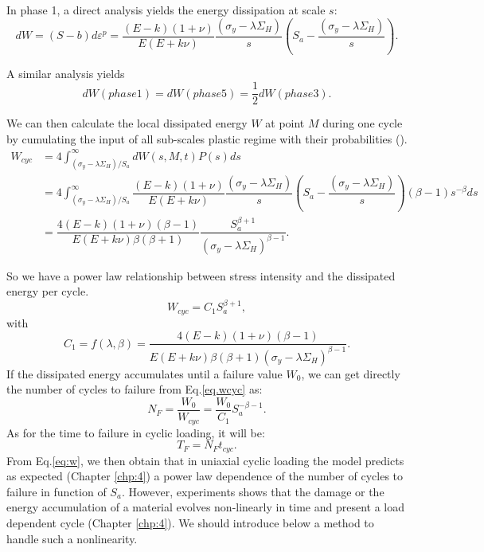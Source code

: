 \documentclass[3p,times,procedia,number]{elsarticle}
\begin{document}
In phase 1, a direct analysis yields the energy dissipation at scale $s$:
\begin{equation}dW=(S-b)d\varepsilon^p=\dfrac{(E-k)(1+\nu) }{E(E+k\nu)}\dfrac{ \left(\sigma_y-\lambda \Sigma_H\right)}{s}\left(S_{a}-\dfrac{ \left(\sigma_y-\lambda \Sigma_H\right)}{s}\right).
\label{dw}
\end{equation}

A similar analysis yields $$dW(phase 1)=dW(phase 5)=\dfrac{1}{2}dW(phase 3).$$

We can then calculate  the local dissipated energy $W$  at point $M$ during one cycle by cumulating the input of all sub-scales plastic regime with their probabilities (\cite{zepeng}).
\begin{equation}
\begin{split}
W_{cyc}&=4\int_{ \left(\sigma_y-\lambda \Sigma_H\right) /S_{a}}^{\infty}dW(s,M,t)P(s)ds
\\&=4\int_{ \left(\sigma_y-\lambda \Sigma_H\right) /S_{a}}^{\infty}\dfrac{(E-k)(1+\nu) }{E(E+k\nu)}\dfrac{ \left(\sigma_y-\lambda \Sigma_H\right)}{s}\left(S_{a}-\dfrac{ \left(\sigma_y-\lambda \Sigma_H\right)}{s}\right)\left( \beta-1\right) s^{-\beta}ds
\\&=\dfrac{4(E-k)(1+\nu)\left( \beta-1\right) }{ E(E+k\nu)\beta\left( \beta+1\right) }\dfrac{S_{a}^{\beta+1}}{ \left(\sigma_y-\lambda \Sigma_H\right)^{\beta-1}}.
\end{split}
\label{eq:w}
\end{equation}

So we have a power law relationship between stress intensity and the dissipated energy per cycle.
\begin{equation}
W_{cyc}=C_1S_{a}^{\beta+1},
\label{eq.wcyc}
\end{equation}
with 
$$C_1=f(\lambda,\beta)=\dfrac{4(E-k)(1+\nu)\left( \beta-1\right) }{ E(E+k\nu)\beta\left( \beta+1\right)\left(\sigma_y-\lambda \Sigma_H\right)^{\beta-1} }.$$
If the dissipated energy accumulates until a failure value $W_0$, we can get directly the number of cycles to failure from Eq.\eqref{eq.wcyc} as:
\begin{equation}
N_{F}=\dfrac{W_0}{W_{cyc}}=\dfrac{W_0}{C_1}S_{a}^{-\beta-1}.
\label{eq.NFcyc}
\end{equation}
As for the time to failure in cyclic loading, it will be:
$$T_{F}=N_{F}t_{cyc}.$$
From Eq.\eqref{eq:w}, we then obtain that in uniaxial cyclic loading the model predicts as expected (Chapter \ref{chp:4}) a power law dependence of the number of cycles to failure in function of $S_{a}$.
However, experiments shows that the damage or the energy accumulation of a material evolves non-linearly in time and present a load dependent cycle (Chapter \ref{chp:4}). We should introduce below a method to handle such a nonlinearity.
\end{document}
